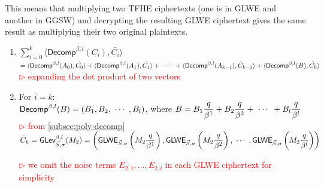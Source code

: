 This means that multiplying two TFHE ciphertexts (one is in GLWE and another in GGSW) and decrypting the resulting GLWE ciphertext gives the same result as multiplying their two original plaintexts. 


\begin{myproof}
\begin{enumerate}
\item $\sum\limits_{i=0}^{k}\langle \textsf{Decomp}^{\beta, l}(C_i), \bar{C_i} \rangle$ \\
$= \langle \textsf{Decomp}^{\beta, l}(A_0), \bar{C_0} \rangle + \langle \textsf{Decomp}^{\beta, l}(A_1), \bar{C_1} \rangle + \text{ } \text{$\cdots$} \text{ } + \langle \textsf{Decomp}^{\beta, l}(A_{k-1}), \bar{C}_{k-1} \rangle + \langle \textsf{Decomp}^{\beta, l}(B), \bar{C_k} \rangle$ \\
\textcolor{red}{ $\rhd$ expanding the dot product of two vectors}
\item For $i = k$: \\
$\textsf{Decomp}^{\beta, l}(B) = (B_1, B_2, \text{ } \text{$\cdots$} \text{ }, B_l)$, where $B = B_1\dfrac{q}{\beta^1} + B_2\dfrac{q}{\beta^2} + \text{ } \text{$\cdots$} \text{ } + B_l\dfrac{q}{\beta^l}$ \textcolor{red}{ $\rhd$ from \autoref{subsec:poly-decomp}}\\
$\bar{C}_k = \textsf{GLev}_{\vec{S}, \sigma}^{\beta, l}(M_2) = \left(\textsf{GLWE}_{\vec{S}, \sigma}\left(M_{2}\dfrac{q}{\beta^1}\right), \textsf{GLWE}_{\vec{S}, \sigma}\left(M_{2}\dfrac{q}{\beta^2}\right), \text{ } \text{$\cdots$} \text{ }, \textsf{GLWE}_{\vec{S}, \sigma}\left(M_{2}\dfrac{q}{\beta^l}\right) \right)$ 

\textcolor{red}{ $\rhd$ we omit the noise terms $E_{2,1}, \ldots, E_{2,l}$ in each GLWE ciphertext for simplicity} \\
$ $


\end{enumerate}
\end{myproof}
